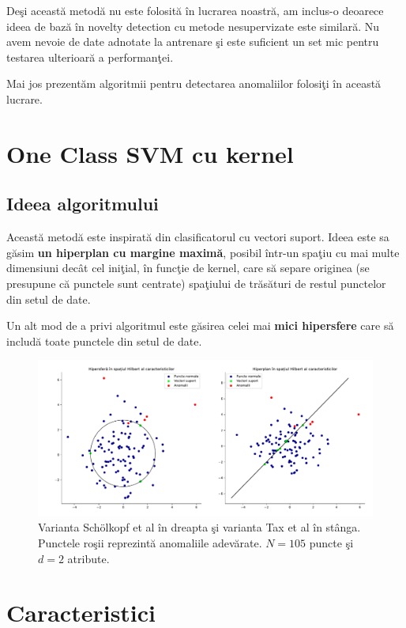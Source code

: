 Deşi această metodă nu este folosită în lucrarea noastră, am inclus-o deoarece 
ideea de bază în novelty detection cu metode nesupervizate este similară. Nu avem 
nevoie de date adnotate la antrenare şi este suficient un set mic pentru testarea 
ulterioară a performanţei.


Mai jos prezentăm algoritmii pentru detectarea anomaliilor folosiţi în această lucrare.


\section{One Class SVM cu kernel}

\subsection{Ideea algoritmului}

Această metodă este inspirată din clasificatorul cu vectori suport. Ideea este 
sa găsim \textbf{un hiperplan cu margine maximă}, posibil într-un spaţiu cu 
mai multe dimensiuni decât cel iniţial, în funcţie de kernel,
care să separe originea (se presupune că punctele sunt centrate) spaţiului de trăsături
de restul punctelor din setul de date\cite{scholkopf2000support}.

Un alt mod de a privi algoritmul este găsirea celei mai \textbf{mici 
hipersfere} care să includă toate punctele din setul de date\cite{tax2004support}.

\begin{figure}[H]
    \centering
    \includegraphics[width=\linewidth]{images/cvx_ocsvm_figures.pdf}
    \caption{Varianta Schölkopf et al în dreapta şi varianta Tax et al în stânga.
        Punctele roşii reprezintă anomaliile adevărate. 
        $N=105$ puncte şi $d=2$ atribute.
    }
\end{figure}

\section{Caracteristici}

